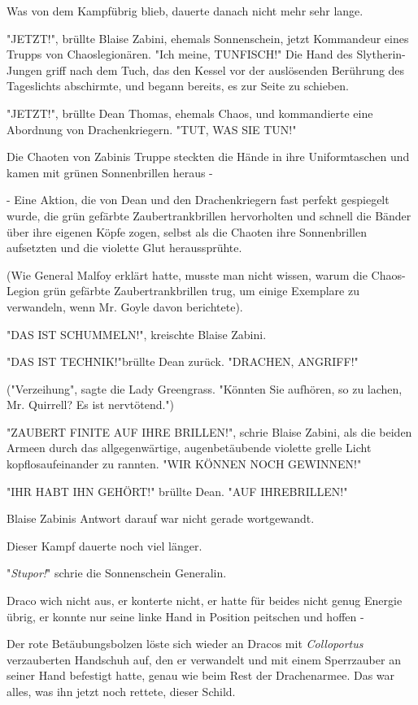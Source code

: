 {Was von dem Kampfübrig blieb, dauerte danach nicht mehr sehr lange.

"JETZT!", brüllte Blaise Zabini, ehemals Sonnenschein, jetzt Kommandeur eines Trupps von Chaoslegionären. "Ich meine, TUNFISCH!" Die Hand des Slytherin-Jungen griff nach dem Tuch, das den Kessel vor der auslösenden Berührung des Tageslichts abschirmte, und begann bereits, es zur Seite zu schieben.

"JETZT!", brüllte Dean Thomas, ehemals Chaos, und kommandierte eine Abordnung von Drachenkriegern. "TUT, WAS SIE TUN!"

Die Chaoten von Zabinis Truppe steckten die Hände in ihre Uniformtaschen und kamen mit grünen Sonnenbrillen heraus -

- Eine Aktion, die von Dean und den Drachenkriegern fast perfekt gespiegelt wurde, die grün gefärbte Zaubertrankbrillen hervorholten und schnell die Bänder über ihre eigenen Köpfe zogen, selbst als die Chaoten ihre Sonnenbrillen aufsetzten und die violette Glut heraussprühte.

(Wie General Malfoy erklärt hatte, musste man nicht wissen, warum die Chaos-Legion grün gefärbte Zaubertrankbrillen trug, um einige Exemplare zu verwandeln, wenn Mr. Goyle davon berichtete).

"DAS IST SCHUMMELN!", kreischte Blaise Zabini.

"DAS IST TECHNIK!"brüllte Dean zurück. "DRACHEN, ANGRIFF!"

("Verzeihung", sagte die Lady Greengrass. "Könnten Sie aufhören, so zu lachen, Mr. Quirrell? Es ist nervtötend.")

"ZAUBERT FINITE AUF IHRE BRILLEN!", schrie Blaise Zabini, als die beiden Armeen durch das allgegenwärtige, augenbetäubende violette grelle Licht kopflosaufeinander zu rannten. "WIR KÖNNEN NOCH GEWINNEN!"

"IHR HABT IHN GEHÖRT!" brüllte Dean. "AUF IHREBRILLEN!"

Blaise Zabinis Antwort darauf war nicht gerade wortgewandt.

Dieser Kampf dauerte noch viel länger.

"\emph{Stupor!}" schrie die Sonnenschein Generalin.

Draco wich nicht aus, er konterte nicht, er hatte für beides nicht genug Energie übrig, er konnte nur seine linke Hand in Position peitschen und hoffen -

Der rote Betäubungsbolzen löste sich wieder an Dracos mit \emph{Colloportus} verzauberten Handschuh auf, den er verwandelt und mit einem Sperrzauber an seiner Hand befestigt hatte, genau wie beim Rest der Drachenarmee. Das war alles, was ihn jetzt noch rettete, dieser Schild.

}
